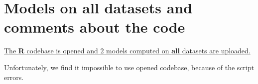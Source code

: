 \documentclass{beamer}\usepackage[]{graphicx}\usepackage[]{color}
\begin{document}
\section{Models on all datasets and comments about the code}
\begin{frame}

     \href{http://clip.med.yale.edu/shm/download.php}{The \textbf{R} codebase is opened and 2 models computed on \textbf{all} datasets are uploaded.}

     \bigskip

     Unfortunately, we find it impossible to use opened codebase, because of the script errors.
\end{frame}
\end{document}

